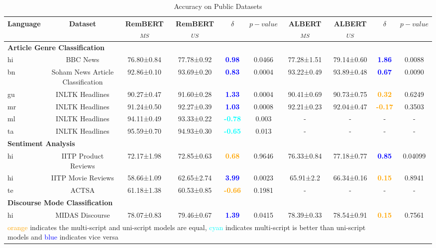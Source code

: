 \documentclass[11pt]{article}
\begin{document}
\begin{table*}[hbt!]
\centering
\begin{adjustbox}{max width=\textwidth}
\small
\begin{tabular}{l c| c c c c| c c c c}
\toprule[2pt]
\textbf{Language} & \textbf{Dataset}  & RemBERT\textsubscript{$MS$}           & RemBERT\textsubscript{$US$}     &\textbf{$\delta$}           & \textbf{$p-value$}      & ALBERT\textsubscript{$MS$}          & ALBERT\textsubscript{$US$} &  \textbf{$\delta$}           & \textbf{$p-value$} \\          
\midrule[2pt]
\multicolumn{8}{l}{\textbf{Article Genre Classification}}\\
hi          & BBC News  & 76.80±0.84& 77.78±0.92 & \textcolor{blue}{\textbf{0.98}} &0.0466 & 77.28±1.51 & 79.14±0.60  & \textcolor{blue}{\textbf{1.86}} & 0.0088\\
bn          & Soham News Article Classification & 92.86±0.10 & 93.69±0.20 & \textcolor{blue}{\textbf{0.83}} &0.0004 & 93.22±0.49 & 93.89±0.48  & \textcolor{blue}{\textbf{0.67}} & 0.0090\\
gu          & INLTK Headlines  & 90.27±0.47 & 91.60±0.28 & \textcolor{blue}{\textbf{1.33}} &0.0004 & 90.41±0.69 & 90.73±0.75   &\textcolor{orange}{\textbf{0.32}} & 0.6249\\
mr          & INLTK Headlines  & 91.24±0.50 & 92.27±0.39 & \textcolor{blue}{\textbf{1.03}} & 0.0008 &  92.21±0.23 & 92.04±0.47  &\textcolor{orange}{\textbf{-0.17}} & 0.3503\\
ml          & INLTK Headlines  & 94.11±0.49 & 93.33±0.22 & \textcolor{cyan}{\textbf{-0.78}} &0.003 &- &- &- &-\\
ta          & INLTK Headlines  & 95.59±0.70 & 94.93±0.30 & \textcolor{cyan}{\textbf{-0.65}} &0.013 &- &- &- &-\\
\midrule[2pt] 
\multicolumn{8}{l}{\textbf{Sentiment Analysis}}\\
hi          & IITP Product Reviews & 72.17±1.98 & 72.85±0.63 & \textcolor{orange}{\textbf{0.68}} &0.9646 & 76.33±0.84 & 77.18±0.77    & \textcolor{blue}{\textbf{0.85}} & 0.04099 \\
hi          & IITP Movie Reviews & 58.66±1.09 & 62.65±2.74 & \textcolor{blue}{\textbf{3.99}} &0.0023 & 65.91±2.2 & 66.34±0.16  & \textcolor{orange}{\textbf{0.15}} & 0.8941  \\
te          & ACTSA & 61.18±1.38 & 60.53±0.85 & \textcolor{orange}{\textbf{-0.66}} &0.1981 &- &- &- &-  \\
\midrule[2pt]
\multicolumn{8}{l}{\textbf{Discourse Mode Classification}}\\
hi          & MIDAS Discourse & 78.07±0.83 & 79.46±0.67 & \textcolor{blue}{\textbf{1.39}} &0.0415 & 78.39±0.33 & 78.54±0.91 & \textcolor{orange}{\textbf{0.15}} & 0.7561  \\
\bottomrule[2pt]
\multicolumn{8}{l}{\textcolor{orange}{orange} indicates the multi-script and uni-script models are equal, \textcolor{cyan}{cyan} indicates multi-script is better than uni-script models and \textcolor{blue}{blue} indicates vice versa}
\end{tabular}
\end{adjustbox}
\caption{Accuracy on Public Datasets}
\label{table-res-pb}
\end{table*}
\end{document}
